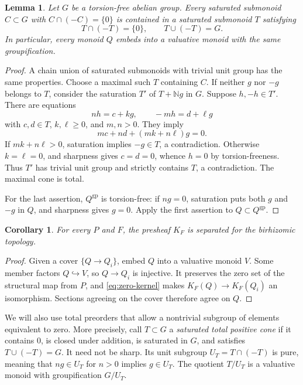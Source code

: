\documentclass[11pt]{article}
\newtheorem{lemma}[theorem]{Lemma}
\newtheorem{corollary}[theorem]{Corollary}
\theoremstyle{definition}
\theoremstyle{remark}
\newcommand{\N}{\mathbb N}
\newcommand{\gp}{\mathrm{gp}}
\begin{document}
\begin{lemma}\label{lem:order}
Let $G$ be a torsion-free abelian group. Every saturated submonoid $C\subset G$ with $C\cap(-C)=\{0\}$ is contained in a saturated submonoid $T$ satisfying
\[
 T\cap(-T)=\{0\},\qquad T\cup(-T)=G.
\]
In particular, every monoid $Q$ embeds into a valuative monoid with the same groupification.
\end{lemma}

\begin{proof}
A chain union of saturated submonoids with trivial unit group has the same properties. Choose a maximal such $T$ containing $C$. If neither $g$ nor $-g$ belongs to $T$, consider the saturation $T'$ of $T+\N g$ in $G$. Suppose $h,-h\in T'$. There are equations
\[
 nh=c+kg,\qquad -mh=d+\ell g
\]
with $c,d\in T$, $k,\ell\geq0$, and $m,n>0$. They imply
\[
 mc+nd+(mk+n\ell)g=0.
\]
If $mk+n\ell>0$, saturation implies $-g\in T$, a contradiction. Otherwise $k=\ell=0$, and sharpness gives $c=d=0$, whence $h=0$ by torsion-freeness. Thus $T'$ has trivial unit group and strictly contains $T$, a contradiction. The maximal cone is total.

For the last assertion, $Q^{\gp}$ is torsion-free: if $ng=0$, saturation puts both $g$ and $-g$ in $Q$, and sharpness gives $g=0$. Apply the first assertion to $Q\subset Q^{\gp}$.
\end{proof}

\begin{corollary}\label{cor:separated}
For every $P$ and $F$, the presheaf $K_F$ is separated for the birhizomic topology.
\end{corollary}

\begin{proof}
Given a cover $\{Q\to Q_i\}$, embed $Q$ into a valuative monoid $V$. Some member factors $Q\hookrightarrow V$, so $Q\to Q_i$ is injective. It preserves the zero set of the structural map from $P$, and \eqref{eq:zero-kernel} makes $K_F(Q)\to K_F(Q_i)$ an isomorphism. Sections agreeing on the cover therefore agree on $Q$.
\end{proof}

We will also use total preorders that allow a nontrivial subgroup of elements equivalent to zero. More precisely, call $T\subset G$ a \emph{saturated total positive cone} if it contains $0$, is closed under addition, is saturated in $G$, and satisfies $T\cup(-T)=G$. It need not be sharp. Its unit subgroup $U_T=T\cap(-T)$ is pure, meaning that $ng\in U_T$ for $n>0$ implies $g\in U_T$. The quotient $T/U_T$ is a valuative monoid with groupification $G/U_T$.
\end{document}
